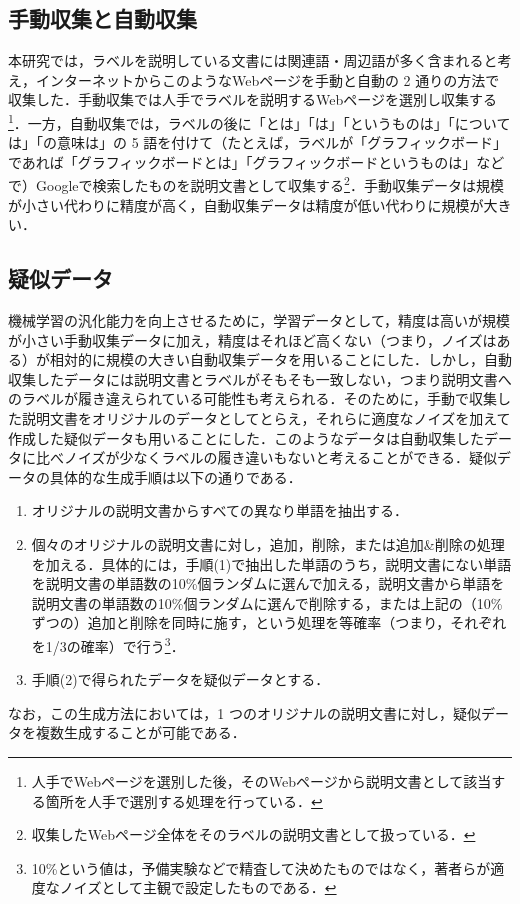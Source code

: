 \documentclass[japanese]{jnlp_1.4}
\begin{document}
\subsection{手動収集と自動収集}

本研究では，ラベルを説明している文書には関連語・周辺語が多く含まれると考え，インターネットからこのようなWebページを手動と自動の 2 通りの方法で収集した．手動収集では人手でラベルを説明するWebページを選別し収集する\footnote{人手でWebページを選別した後，そのWebページから説明文書として該当する箇所を人手で選別する処理を行っている．}．一方，自動収集では，ラベルの後に「とは」「は」「というものは」「については」「の意味は」の 5 語を付けて（たとえば，ラベルが「グラフィックボード」であれば「グラフィックボードとは」「グラフィックボードというものは」などで）Googleで検索したものを説明文書として収集する\footnote{収集したWebページ全体をそのラベルの説明文書として扱っている．}．手動収集データは規模が小さい代わりに精度が高く，自動収集データは精度が低い代わりに規模が大きい．


\subsection{疑似データ}

機械学習の汎化能力を向上させるために，学習データとして，精度は高いが規模が小さい手動収集データに加え，精度はそれほど高くない（つまり，ノイズはある）が相対的に規模の大きい自動収集データを用いることにした．しかし，自動収集したデータには説明文書とラベルがそもそも一致しない，つまり説明文書へのラベルが履き違えられている可能性も考えられる．そのために，手動で収集した説明文書をオリジナルのデータとしてとらえ，それらに適度なノイズを加えて作成した疑似データも用いることにした．このようなデータは自動収集したデータに比べノイズが少なくラベルの履き違いもないと考えることができる．疑似データの具体的な生成手順は以下の通りである．
\begin{enumerate}
\item オリジナルの説明文書からすべての異なり単語を抽出する．
\item 個々のオリジナルの説明文書に対し，追加，削除，または追加\&削除の処理を加える．具体的には，手順(1)で抽出した単語のうち，説明文書にない単語を説明文書の単語数の10\%個ランダムに選んで加える，説明文書から単語を説明文書の単語数の10\%個ランダムに選んで削除する，または上記の（10\%ずつの）追加と削除を同時に施す，という処理を等確率（つまり，それぞれを1/3の確率）で行う\footnote{10\%という値は，予備実験などで精査して決めたものではなく，著者らが適度なノイズとして主観で設定したものである．}．
\item 手順(2)で得られたデータを疑似データとする．
\end{enumerate}
なお，この生成方法においては，1 つのオリジナルの説明文書に対し，疑似データを複数生成することが可能である．
\end{document}
